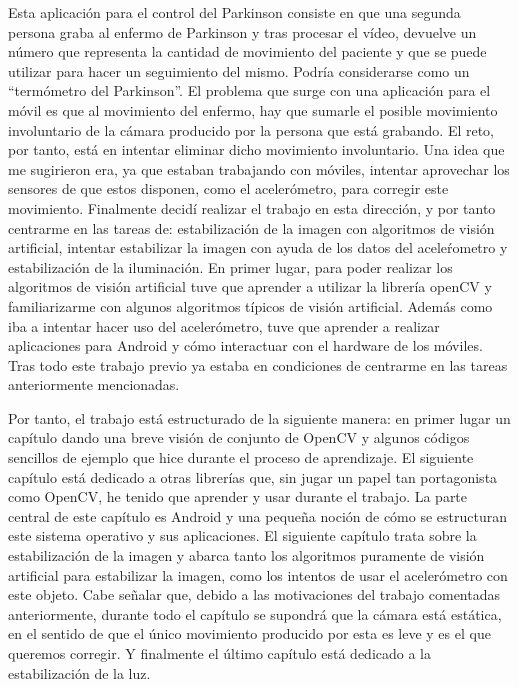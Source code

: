 \documentclass[a4paper,openright, 12pt]{book}
\begin{document}
Esta aplicación para el control del Parkinson consiste en que una segunda persona graba al enfermo de Parkinson y tras procesar el vídeo, devuelve un número que representa la cantidad de movimiento del paciente y que se puede utilizar para hacer un seguimiento del mismo. Podría considerarse como un ``termómetro del Parkinson''. El problema que surge con una aplicación para el móvil es que al movimiento del enfermo, hay que sumarle el posible movimiento involuntario de la cámara producido por la persona que está grabando. El reto, por tanto, está en intentar eliminar dicho movimiento involuntario. Una idea que me sugirieron era, ya que estaban trabajando con móviles, intentar aprovechar los sensores de que estos disponen, como el acelerómetro, para corregir este  movimiento.
\newpage
Finalmente decidí realizar el trabajo en esta dirección, y por tanto centrarme en las tareas de: estabilización de la imagen con algoritmos de visión artificial, intentar estabilizar la imagen con ayuda de los datos del aceleŕometro y estabilización de la iluminación.
En primer lugar, para poder realizar los algoritmos de visión artificial tuve que aprender a utilizar la librería openCV y familiarizarme con algunos algoritmos típicos de visión artificial. Además como iba a intentar hacer uso del acelerómetro, tuve que aprender a realizar aplicaciones para Android y cómo interactuar con el hardware de los móviles. Tras todo este trabajo previo ya estaba en condiciones de centrarme en las tareas anteriormente mencionadas.

Por tanto, el trabajo está estructurado de la siguiente manera:
en primer lugar un capítulo dando una breve visión de conjunto de OpenCV y algunos códigos sencillos de ejemplo que hice durante el proceso de aprendizaje.
\newline
El siguiente capítulo está dedicado a otras librerías que, sin jugar un papel tan portagonista como OpenCV, he tenido que aprender y usar durante el trabajo. La parte central de este capítulo es Android y una pequeña noción de cómo se estructuran este sistema operativo y sus aplicaciones.
\newline
El siguiente capítulo trata sobre la estabilización de la imagen y abarca tanto los algoritmos puramente de visión artificial para estabilizar la imagen, como los intentos de usar el acelerómetro con este objeto. Cabe señalar que, debido a las motivaciones del trabajo comentadas anteriormente, durante todo el capítulo se supondrá que la cámara está estática, en el sentido de que el único movimiento producido por esta es leve y es el que queremos corregir.
\newline
Y finalmente el último capítulo está dedicado a la estabilización de la luz.
\end{document}

